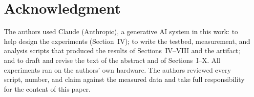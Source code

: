 \documentclass[conference]{IEEEtran}
\begin{document}






\section*{Acknowledgment}
The authors used Claude (Anthropic), a generative AI system in this work: to
help design the experiments (Section~IV); to write the testbed, measurement,
and analysis scripts that produced the results of Sections~IV--VIII and the
artifact; and to draft and revise the text of the abstract and of
Sections~I--X. All experiments ran on the
authors' own hardware. The authors reviewed every script, number, and claim
against the measured data and take full responsibility for the content of
this paper.



\end{document}
